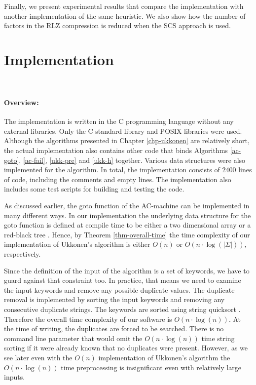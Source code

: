 \documentclass[english,twoside,censored,csm,algorithms-track-2020]{HYthesisML}
\theoremstyle{plain}
\theoremstyle{definition}
\numberwithin{testexample}{chapter}
\begin{document}
Finally, we present experimental results that compare the implementation with
another implementation of the same heuristic. We also show how the number of factors in the
RLZ compression is reduced when the SCS approach is used.

\section{Implementation}~\label{sec-our}

\paragraph{Overview:}
The implementation is written in the C programming language without any external
libraries. Only the C standard library and POSIX libraries were used.
Although the algorithms presented in Chapter
\ref{chp-ukkonen} are relatively short, the actual implementation also contains other code
that binds Algorithms \ref{ac-goto}, \ref{ac-fail}, \ref{ukk-pre} and \ref{ukk-h} together. 
Various data structures were also implemented for the algorithm. In total, the implementation consists
of 2400 lines of code, including the comments and empty lines. The implementation also includes some
test scripts for building and testing the code. 

As discussed earlier, the goto function of the AC-machine can be implemented in many different
ways. In our implementation the underlying data structure for the goto function is defined at compile
time to be either a two dimensional array or a red-black tree \citep{Cormen09}. Hence, by Theorem \ref{thm-overall-time}
the time complexity of our implementation of Ukkonen's algorithm is either $O(n)$ or
$O(n\cdot\log(|\Sigma|))$, respectively.

Since the definition of the input of the algorithm is a set of keywords, we have to guard against that
constraint too. In practice, that means we need to examine the input keywords and remove any possible
duplicate values. The duplicate removal is implemented by sorting the input keywords and removing any
consecutive duplicate strings. The keywords are sorted using string quicksort \citep{Bentley97}.
Therefore the overall time complexity of our software is $O(n\cdot\log(n))$. At the time of writing, the
duplicates are forced to be searched. There is no command line parameter that would omit the 
$O(n\cdot\log(n))$ time string sorting if it were already known that no duplicates were present.
However, as we see later even with the $O(n)$ implementation
of Ukkonen's algorithm the $O(n\cdot\log(n))$ time preprocessing is insignificant even with relatively
large inputs.
\end{document}
